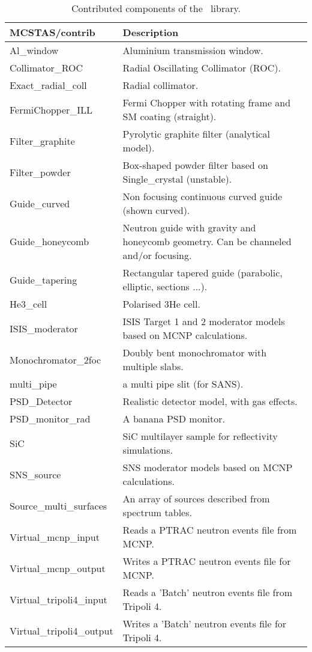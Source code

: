 \begin{table}
  \begin{center}
    {\let\my=\\
    \begin{tabular}{|p{}|p{}|}
      \hline
       {\bf MCSTAS/contrib} & Description \\
       \hline
 Al\_window     &         Aluminium transmission window. \\
 Collimator\_ROC   &      Radial Oscillating Collimator (ROC). \\
 Exact\_radial\_coll &      Radial collimator. \\
 FermiChopper\_ILL &       Fermi Chopper with rotating frame and SM coating (straight). \\
 Filter\_graphite  &      Pyrolytic graphite filter (analytical model). \\
 Filter\_powder   &       Box-shaped powder
                        filter based on Single\_crystal (unstable). \\
 Guide\_curved     &     Non focusing continuous curved guide (shown curved). \\
 Guide\_honeycomb & Neutron guide with gravity and honeycomb geometry. Can be
                        channeled and/or focusing. \\
 Guide\_tapering  &     Rectangular tapered guide (parabolic, elliptic, sections ...). \\
 He3\_cell    &           Polarised 3He cell. \\
 ISIS\_moderator    &     ISIS Target 1 and 2 moderator models based on MCNP calculations. \\
 Monochromator\_2foc   &  Doubly bent monochromator with multiple slabs. \\
 multi\_pipe       & a multi pipe slit (for SANS). \\
 PSD\_Detector  & Realistic detector model, with gas effects. \\
 PSD\_monitor\_rad & A banana PSD monitor. \\
 SiC           &         SiC multilayer sample for reflectivity simulations. \\
 SNS\_source    & SNS moderator models based on MCNP calculations. \\
 Source\_multi\_surfaces & An array of sources described from spectrum tables. \\
 Virtual\_mcnp\_input & Reads a PTRAC neutron events file from MCNP. \\
 Virtual\_mcnp\_output& Writes a PTRAC neutron events file for MCNP. \\
 Virtual\_tripoli4\_input & Reads a 'Batch' neutron events file from Tripoli 4. \\
 Virtual\_tripoli4\_output& Writes a 'Batch' neutron events file for Tripoli 4. \\
      \hline
    \end{tabular}
    \caption{Contributed components of the \MCS\ library.}
    \label{t:comp-contrib}
    }
  \end{center}
\end{table}

